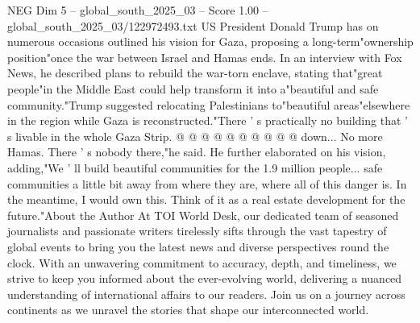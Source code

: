 \begin{textsample}{NEG Dim 5 – global\_south\_2025\_03 – Score 1.00 – global\_south\_2025\_03/122972493.txt}
US President Donald Trump has on numerous occasions outlined his vision for Gaza, proposing a long-term"ownership position"once the war between Israel and Hamas ends.
In an interview with Fox News, he described plans to rebuild the war-torn enclave, stating that"great people"in the Middle East could help transform it into a"beautiful and safe community."Trump suggested relocating Palestinians to"beautiful areas"elsewhere in the region while Gaza is reconstructed."There ' s practically no building that ' s livable in the whole Gaza Strip. @ @ @ @ @ @ @ @ @ @ down...
No more Hamas.
There ' s nobody there,"he said.
He further elaborated on his vision, adding,"We ' ll build beautiful communities for the 1.9 million people... safe communities a little bit away from where they are, where all of this danger is.
In the meantime, I would own this.
Think of it as a real estate development for the future."About the Author At TOI World Desk, our dedicated team of seasoned journalists and passionate writers tirelessly sifts through the vast tapestry of global events to bring you the latest news and diverse perspectives round the clock.
With an unwavering commitment to accuracy, depth, and timeliness, we strive to keep you informed about the ever-evolving world, delivering a nuanced understanding of international affairs to our readers.
Join us on a journey across continents as we unravel the stories that shape our interconnected world.

\end{textsample}
